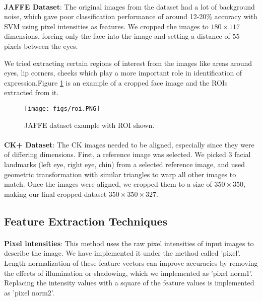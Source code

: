 \documentclass[10pt,twocolumn,letterpaper]{article}
\begin{document}
\paragraph{}
\textbf{
JAFFE Dataset}: The original images from the dataset had a lot of background noise, which gave poor classification performance of around 12-20\% accuracy with SVM using pixel intensities as features. We cropped the images to $180\times117$ dimensions, forcing only the face into the image and setting a distance of 55 pixels between the eyes. 
\par
We tried extracting certain regions of interest from the images like areas around eyes, lip corners, cheeks which play a more important role in identification of expression.Figure \ref{fig:jaffe_roi_examples} is an example of a cropped face image and the ROIs extracted from it.

 \begin{figure}[h]
\texttt{[image: figs/roi.PNG]}
\caption{JAFFE dataset example with ROI shown.}
\label{fig:jaffe_roi_examples}
\end{figure}

\paragraph{}
\subitem \textbf{
CK+ Dataset}: The CK images needed to be aligned, especially since they were of differing dimensions. First, a reference image was selected. We picked 3 facial landmarks (left eye, right eye, chin) from a selected reference image, and used geometric transformation with similar triangles to warp all other images to match. Once the images were aligned, we cropped them to a size of $350\times350$, making our final cropped dataset $350\times350\times327$. 

\subsection{Feature Extraction Techniques}
\paragraph{}
\textbf{
Pixel intensities}: This method uses the raw pixel intensities of input images to describe the image. We have implemented it under the method called 'pixel'. Length normalization of these feature vectors can improve accuracies by removing the effects of illumination or shadowing, which we implemented as 'pixel norm1'. Replacing the intensity values with a square of the feature values is implemented as 'pixel norm2'.
\end{document}
